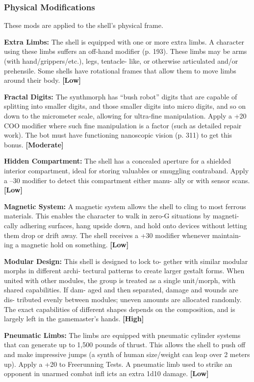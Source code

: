 \subsubsection{Physical Modifications}

These mods are applied to the shell's physical frame.

\textbf{Extra Limbs:} The shell is equipped with one or 
more extra limbs. A character using these limbs 
suffers an off-hand modifier (p. 193). These limbs 
may be arms (with hand/grippers/etc.), legs, tentacle-
like, or otherwise articulated and/or prehensile. Some 
shells have rotational frames that allow them to move 
limbs around their body. \textbf{[Low]}

\textbf{Fractal Digits:} The synthmorph has ``bush robot'' 
digits that are capable of splitting into smaller digits, 
and those smaller digits into micro digits, and so on 
down to the micrometer scale, allowing for ultra-fine 
manipulation. Apply a +20 COO modifier where such 
fine manipulation is a factor (such as detailed repair 
work). The bot must have functioning nanoscopic 
vision (p. 311) to get this bonus. \textbf{[Moderate]}

\textbf{Hidden Compartment:} The shell has a concealed 
aperture for a shielded interior compartment, ideal for 
storing valuables or smuggling contraband. Apply a 
–30 modifier to detect this compartment either manu-
ally or with sensor scans. \textbf{[Low]}

\textbf{Magnetic System:} A magnetic system allows the 
shell to cling to most ferrous materials. This enables 
the character to walk in zero-G situations by magneti-
cally adhering surfaces, hang upside down, and hold 
onto devices without letting them drop or drift away. 
The shell receives a +30 modifier whenever maintain-
ing a magnetic hold on something. \textbf{[Low]}

\textbf{Modular Design:} This shell is designed to lock to-
gether with similar modular morphs in different archi-
tectural patterns to create larger gestalt forms. When 
united with other modules, the group is treated as a 
single unit/morph, with shared capabilities. If dam-
aged and then separated, damage and wounds are dis-
tributed evenly between modules; uneven amounts are 
allocated randomly. The exact capabilities of different 
shapes depends on the composition, and is largely left 
in the gamemaster's hands. \textbf{[High]}

\textbf{Pneumatic Limbs:} The limbs are equipped with 
pneumatic cylinder systems that can generate up to 
1,500 pounds of thrust. This allows the shell to push 
off and make impressive jumps (a synth of human 
size/weight can leap over 2 meters up). Apply a +20 to 
Freerunning Tests. A pneumatic limb used to strike an 
opponent in unarmed combat infl icts an extra 1d10 
damage. \textbf{[Low]}

